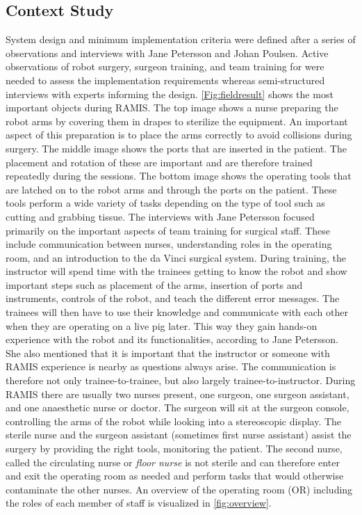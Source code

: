 \documentclass[conference]{IEEEtran}
\begin{document}
\subsection{Context Study}
System design and minimum implementation criteria were defined after a series of observations and interviews with Jane Petersson and Johan Poulsen. Active observations of robot surgery, surgeon training, and team training for were needed to assess the implementation requirements whereas semi-structured interviews with experts informing the design. 
\autoref{Fig:fieldresult} shows the most important objects during RAMIS. The top image shows a nurse preparing the robot arms by covering them in drapes to sterilize the equipment. An important aspect of this preparation is to place the arms correctly to avoid collisions during surgery. The middle image shows the ports that are inserted in the patient. The placement and rotation of these are important and are therefore trained repeatedly during the sessions. The bottom image shows the operating tools that are latched on to the robot arms and through the ports on the patient. These tools perform a wide variety of tasks depending on the type of tool such as cutting and grabbing tissue.
The interviews with Jane Petersson focused primarily on the important aspects of team training for surgical staff. These include communication between nurses, understanding roles in the operating room, and an introduction to the da Vinci surgical system. During training, the instructor will spend time with the trainees getting to know the robot and show important steps such as placement of the arms, insertion of ports and instruments, controls of the robot, and teach the different error messages. The trainees will then have to use their knowledge and communicate with each other when they are operating on a live pig later. This way they gain hands-on experience with the robot and its functionalities, according to Jane Petersson. She also mentioned that it is important that the instructor or someone with RAMIS experience is nearby as questions always arise. The communication is therefore not only trainee-to-trainee, but also largely trainee-to-instructor.
During RAMIS there are usually two nurses present, one surgeon, one surgeon assistant, and one anaesthetic nurse or doctor. The surgeon will sit at the surgeon console, controlling the arms of the robot while looking into a stereoscopic display. The sterile nurse and the surgeon assistant (sometimes first nurse assistant) assist the surgery by providing the right tools, monitoring the patient. The second nurse, called the circulating nurse or \textit{floor nurse} is not sterile and can therefore enter and exit the operating room as needed and perform tasks that would otherwise contaminate the other nurses. An overview of the operating room (OR) including the roles of each member of staff is visualized in \autoref{fig:overview}.
\end{document}
